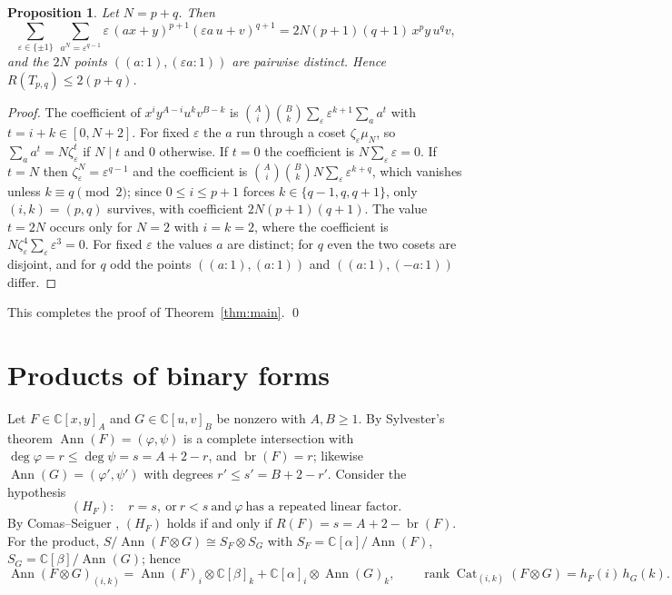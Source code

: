 \documentclass[11pt]{amsart}
\newtheorem{proposition}[theorem]{Proposition}
\theoremstyle{remark}
\newcommand{\C}{\mathbb{C}}
\DeclareMathOperator{\Ann}{Ann}
\DeclareMathOperator{\Cat}{Cat}
\DeclareMathOperator{\rank}{rank}
\DeclareMathOperator{\br}{br}
\begin{document}
\begin{proposition}\label{prop:upper}
Let $N=p+q$. Then
\[
\sum_{\varepsilon\in\{\pm1\}}\ \sum_{a^N=\varepsilon^{q-1}}\varepsilon\,(ax+y)^{p+1}(\varepsilon a\,u+v)^{q+1}=2N(p+1)(q+1)\,x^py\,u^qv,
\]
and the $2N$ points $((a:1),(\varepsilon a:1))$ are pairwise distinct. Hence $R(T_{p,q})\le 2(p+q)$.
\end{proposition}
\begin{proof}
The coefficient of $x^iy^{A-i}u^kv^{B-k}$ is $\binom Ai\binom Bk\sum_\varepsilon\varepsilon^{k+1}\sum_a a^{t}$ with $t=i+k\in[0,N+2]$. For fixed $\varepsilon$ the $a$ run through a coset $\zeta_\varepsilon\mu_N$, so $\sum_aa^t=N\zeta_\varepsilon^t$ if $N\mid t$ and $0$ otherwise. If $t=0$ the coefficient is $N\sum_\varepsilon\varepsilon=0$. If $t=N$ then $\zeta_\varepsilon^N=\varepsilon^{q-1}$ and the coefficient is $\binom Ai\binom Bk N\sum_\varepsilon\varepsilon^{k+q}$, which vanishes unless $k\equiv q\pmod 2$; since $0\le i\le p+1$ forces $k\in\{q-1,q,q+1\}$, only $(i,k)=(p,q)$ survives, with coefficient $2N(p+1)(q+1)$. The value $t=2N$ occurs only for $N=2$ with $i=k=2$, where the coefficient is $N\zeta_\varepsilon^4\sum_\varepsilon\varepsilon^3=0$. For fixed $\varepsilon$ the values $a$ are distinct; for $q$ even the two cosets are disjoint, and for $q$ odd the points $((a:1),(a:1))$ and $((a:1),(-a:1))$ differ.
\end{proof}

This completes the proof of Theorem~\ref{thm:main}. \qed

\section{Products of binary forms}\label{sec:binary}

Let $F\in\C[x,y]_A$ and $G\in\C[u,v]_B$ be nonzero with $A,B\ge1$. By Sylvester's theorem $\Ann(F)=(\varphi,\psi)$ is a complete intersection with $\deg\varphi=r\le\deg\psi=s=A+2-r$, and $\br(F)=r$; likewise $\Ann(G)=(\varphi',\psi')$ with degrees $r'\le s'=B+2-r'$. Consider the hypothesis
\[
(H_F):\quad r=s,\ \text{or}\ r<s\ \text{and}\ \varphi\ \text{has a repeated linear factor}.
\]
By Comas--Seiguer \cite{CS}, $(H_F)$ holds if and only if $R(F)=s=A+2-\br(F)$. For the product, $S/\Ann(F\otimes G)\cong S_F\otimes S_G$ with $S_F=\C[\alpha]/\Ann(F)$, $S_G=\C[\beta]/\Ann(G)$; hence
\begin{equation}\label{eq:prodann}
\Ann(F\otimes G)_{(i,k)}=\Ann(F)_i\otimes\C[\beta]_k+\C[\alpha]_i\otimes\Ann(G)_k,\qquad \rank\Cat_{(i,k)}(F\otimes G)=h_F(i)\,h_G(k).
\end{equation}
\end{document}
